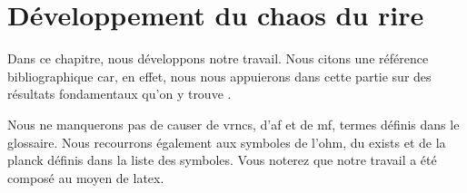 \chapter{Développement du chaos du rire}
\label{chap-developpement}


Dans ce chapitre, nous développons notre travail. Nous citons une
référence
bibliographique \autocite{relativite}
car, en effet, nous nous appuierons dans cette partie sur des
résultats fondamentaux qu'on y trouve
\autocite[chap.~3]{relativite}.

Nous ne manquerons pas de causer de \glspl{vrnc}, d'\gls{af} et de \gls{mf},
termes définis dans le glossaire. Nous recourrons également aux
symboles de l'\gls{ohm}, du \gls{exists} et de la \gls{planck} définis dans la
liste des symboles. Vous noterez que notre travail a été composé au moyen de
\gls{latex}.

